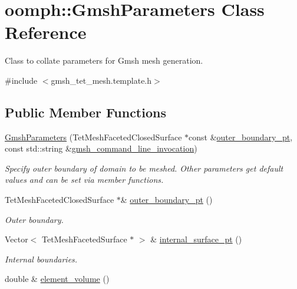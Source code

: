 \hypertarget{classoomph_1_1GmshParameters}{}\section{oomph\+:\+:Gmsh\+Parameters Class Reference}
\label{classoomph_1_1GmshParameters}


Class to collate parameters for Gmsh mesh generation.  




{\ttfamily \#include $<$gmsh\+\_\+tet\+\_\+mesh.\+template.\+h$>$}

\subsection*{Public Member Functions}
\begin{DoxyCompactItemize}
\item 
\hyperlink{classoomph_1_1GmshParameters_a6a4e43f09a5de3155dee5b3d5c1a206b}{Gmsh\+Parameters} (Tet\+Mesh\+Faceted\+Closed\+Surface $\ast$const \&\hyperlink{classoomph_1_1GmshParameters_abdd71edac9d5fd08a6a9c978d2673a2e}{outer\+\_\+boundary\+\_\+pt}, const std\+::string \&\hyperlink{classoomph_1_1GmshParameters_aaf19a5b331893637974f5a5be8da048c}{gmsh\+\_\+command\+\_\+line\+\_\+invocation})
\begin{DoxyCompactList}\small\item\em Specify outer boundary of domain to be meshed. Other parameters get default values and can be set via member functions. \end{DoxyCompactList}\item 
Tet\+Mesh\+Faceted\+Closed\+Surface $\ast$\& \hyperlink{classoomph_1_1GmshParameters_abdd71edac9d5fd08a6a9c978d2673a2e}{outer\+\_\+boundary\+\_\+pt} ()
\begin{DoxyCompactList}\small\item\em Outer boundary. \end{DoxyCompactList}\item 
Vector$<$ Tet\+Mesh\+Faceted\+Surface $\ast$ $>$ \& \hyperlink{classoomph_1_1GmshParameters_a10f845ea8fb16bf617f5c6ca05e21bf9}{internal\+\_\+surface\+\_\+pt} ()
\begin{DoxyCompactList}\small\item\em Internal boundaries. \end{DoxyCompactList}\item 
double \& \hyperlink{classoomph_1_1GmshParameters_a4c085fa1661d1a27ee95461d275b686f}{element\+\_\+volume} ()

\end{DoxyCompactItemize}
